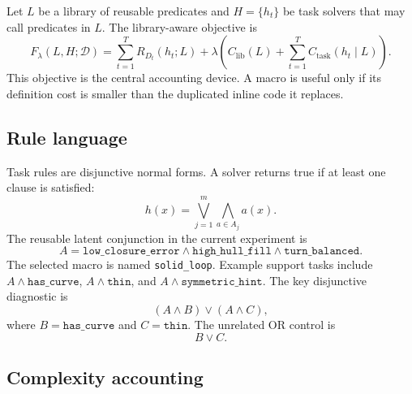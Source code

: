 \documentclass[11pt]{article}
\begin{document}
Let $L$ be a library of reusable predicates and $H=\{h_t\}$ be task solvers that
may call predicates in $L$. The library-aware objective is
\begin{equation}
  F_{\lambda}(L,H;\mathcal{D})=
  \sum_{t=1}^{T} R_{D_t}(h_t;L)
  +\lambda\left(C_{\mathrm{lib}}(L)+
  \sum_{t=1}^{T}C_{\mathrm{task}}(h_t\mid L)\right).
  \label{eq:library-free-energy}
\end{equation}
This objective is the central accounting device. A macro is useful only if its
definition cost is smaller than the duplicated inline code it replaces.

\subsection{Rule language}

Task rules are disjunctive normal forms. A solver returns true if at least one
clause is satisfied:
\begin{equation}
  h(x)=\bigvee_{j=1}^{m}\bigwedge_{a\in A_j} a(x).
\end{equation}
The reusable latent conjunction in the current experiment is
\begin{equation}
  A =
  \texttt{low\_closure\_error}
  \wedge
  \texttt{high\_hull\_fill}
  \wedge
  \texttt{turn\_balanced}.
  \label{eq:solid-loop}
\end{equation}
The selected macro is named \texttt{solid\_loop}. Example support tasks include
$A\wedge\texttt{has\_curve}$,
$A\wedge\texttt{thin}$, and
$A\wedge\texttt{symmetric\_hint}$. The key disjunctive diagnostic is
\begin{equation}
  (A\wedge B)\vee(A\wedge C),
  \label{eq:or-factor}
\end{equation}
where $B=\texttt{has\_curve}$ and $C=\texttt{thin}$. The unrelated OR control is
\begin{equation}
  B\vee C.
  \label{eq:or-control}
\end{equation}

\subsection{Complexity accounting}
\end{document}
